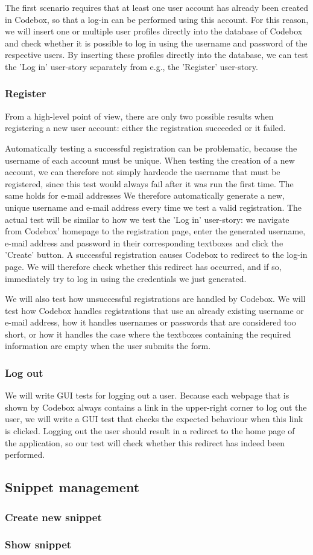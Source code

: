 \documentclass[10pt,a4paper,BCOR12mm, headexclude, footexclude,
  twoside, openright]{scrartcl}
\numberwithin{equation}{section} %
\numberwithin{figure}{section} %
\numberwithin{table}{section} %
\begin{document}
The first scenario requires that at least one user account has already been created in Codebox, so that a log-in can be performed using this account.
For this reason, we will insert one or multiple user profiles directly into the database of Codebox and check whether it is possible to log in using the username and password of the respective users.
By inserting these profiles directly into the database, we can test the 'Log in' user-story separately from e.g., the 'Register' user-story.

\subsubsection*{Register}
From a high-level point of view, there are only two possible results when registering a new user account: either the registration succeeded or it failed.

Automatically testing a successful registration can be problematic, because the username of each account must be unique.
When testing the creation of a new account, we can therefore not simply hardcode the username that must be registered, since this test would always fail after it was run the first time.
The same holds for e-mail addresses
We therefore automatically generate a new, unique username and e-mail address every time we test a valid registration.
The actual test will be similar to how we test the 'Log in' user-story: we navigate from Codebox' homepage to the registration page, enter the generated username, e-mail address and password in their corresponding textboxes and click the 'Create' button.
A successful registration causes Codebox to redirect to the log-in page. We will therefore check whether this redirect has occurred, and if so, immediately try to log in using the credentials we just generated.

We will also test how unsuccessful registrations are handled by Codebox. We will test how Codebox handles registrations that use an already existing username or e-mail address, how it handles usernames or passwords that are considered too short, or how it handles the case where the textboxes containing the required information are empty when the user submits the form.

\subsubsection*{Log out}

We will write GUI tests for logging out a user. Because each webpage that is shown by Codebox always contains a link in the upper-right corner to log out the user, we will write a GUI test that checks the expected behaviour when this link is clicked.
Logging out the user should result in a redirect to the home page of the application, so our test will check whether this redirect has indeed been performed.

\subsection{Snippet management}

\subsubsection*{Create new snippet}

\subsubsection*{Show snippet}
\end{document}
